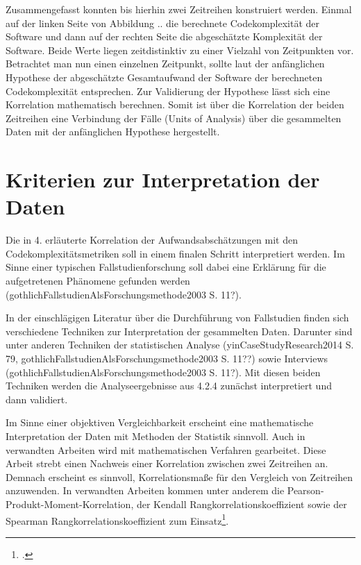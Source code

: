Zusammengefasst konnten bis hierhin zwei Zeitreihen konstruiert werden.
Einmal auf der linken Seite von Abbildung .. die berechnete
Codekomplexität der Software und dann auf der rechten Seite die
abgeschätzte Komplexität der Software. Beide Werte liegen zeitdistinktiv
zu einer Vielzahl von Zeitpunkten vor. Betrachtet man nun einen
einzelnen Zeitpunkt, sollte laut der anfänglichen Hypothese der
abgeschätzte Gesamtaufwand der Software der berechneten Codekomplexität
entsprechen. Zur Validierung der Hypothese lässt sich eine Korrelation
mathematisch berechnen. Somit ist über die Korrelation der beiden
Zeitreihen eine Verbindung der Fälle (Units of Analysis) über die
gesammelten Daten mit der anfänglichen Hypothese hergestellt.

\section{Kriterien zur Interpretation der Daten}\label{kriterien-zur-interpretation-der-daten}

Die in 4. erläuterte Korrelation der Aufwandsabschätzungen mit den
Codekomplexitätsmetriken soll in einem finalen Schritt interpretiert
werden. Im Sinne einer typischen Fallstudienforschung soll dabei eine
Erklärung für die aufgetretenen Phänomene gefunden werden
(gothlichFallstudienAlsForschungsmethode2003 S. 11?).

In der einschlägigen Literatur über die Durchführung von Fallstudien
finden sich verschiedene Techniken zur Interpretation der gesammelten
Daten. Darunter sind unter anderen Techniken der statistischen Analyse
(yinCaseStudyResearch2014 S. 79,
gothlichFallstudienAlsForschungsmethode2003 S. 11??) sowie Interviews
(gothlichFallstudienAlsForschungsmethode2003 S. 11?). Mit diesen beiden
Techniken werden die Analyseergebnisse aus 4.2.4 zunächst interpretiert
und dann validiert.

Im Sinne einer objektiven Vergleichbarkeit erscheint eine mathematische
Interpretation der Daten mit Methoden der Statistik sinnvoll. Auch in
verwandten Arbeiten wird mit mathematischen Verfahren gearbeitet. Diese
Arbeit strebt einen Nachweis einer Korrelation zwischen zwei Zeitreihen
an. Demnach erscheint es sinnvoll, Korrelationsmaße für den Vergleich
von Zeitreihen anzuwenden. In verwandten Arbeiten kommen unter anderem
die Pearson-Produkt-Moment-Korrelation, der Kendall
Rangkorrelationskoeffizient sowie der Spearman
Rangkorrelationskoeffizient zum Einsatz\footcite[Vgl. ][]{(Jay et al 2009:140),
  hindleReadingLinesUsing2009}.

